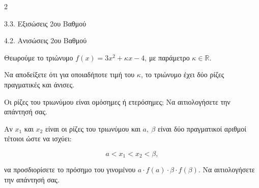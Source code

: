 \begin{ylh}{2}
    \item 3.3. Εξισώσεις 2ου Βαθμού
    \item 4.2. Ανισώσεις 2ου Βαθμού
\end{ylh}
Θεωρούμε το τριώνυμο $f(x) = 3x^{2} + \kappa x - 4$, με παράμετρο $\kappa\mathbb{\in R}$.
\begin{alist}
\item Να αποδείξετε ότι για οποιαδήποτε τιμή του $\kappa$, το τριώνυμο έχει δύο ρίζες πραγματικές και άνισες.
\item Οι ρίζες του τριωνύμου είναι ομόσημες ή ετερόσημες; Να αιτιολογήσετε την απάντησή σας.
\item Αν $x_{1}$ και $x_{2}$ είναι οι ρίζες του τριωνύμου και $a,\ \beta$ είναι δύο πραγματικοί αριθμοί τέτοιοι ώστε να ισχύει:

\begin{equation*}a < x_{1} < x_{2} < \beta,\end{equation*}

να προσδιορίσετε το πρόσημο του γινομένου $a \cdot f(a) \cdot \beta \cdot f(\beta)$. Να αιτιολογήσετε την απάντησή σας.
\end{alist}

